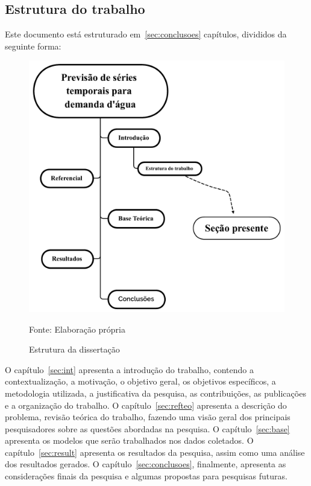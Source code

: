 \subsection{Estrutura do trabalho} \label{subsec:estrutura}

 Este documento está estruturado em~\ref{sec:conclusoes} capítulos, divididos da seguinte forma:
 

    
    \begin{figure}[H]
    	\centering
    	\caption{Estrutura da dissertação}
    	\label{fig:estrutura}
    	\includegraphics[width=0.7\linewidth]{Introducao/Figuras/Estrutura}
    	
    	Fonte: Elaboração própria 
    \end{figure}
O capítulo~\ref{sec:int} apresenta a introdução do trabalho, contendo a contextualização, a motivação, o objetivo geral, os objetivos específicos, a metodologia utilizada, a justificativa da pesquisa, as contribuições, as publicações e a organização do trabalho.
O capítulo~\ref{sec:refteo} apresenta a descrição do problema, revisão teórica do trabalho, fazendo uma visão geral dos principais pesquisadores sobre as questões abordadas na pesquisa.
O capítulo~\ref{sec:base} apresenta os modelos que serão trabalhados nos dados coletados.
O capítulo~\ref{sec:result} apresenta os resultados da pesquisa, assim como uma análise dos resultados gerados.
O capítulo~\ref{sec:conclusoes}, finalmente, apresenta as considerações finais da pesquisa e algumas propostas para pesquisas futuras.
